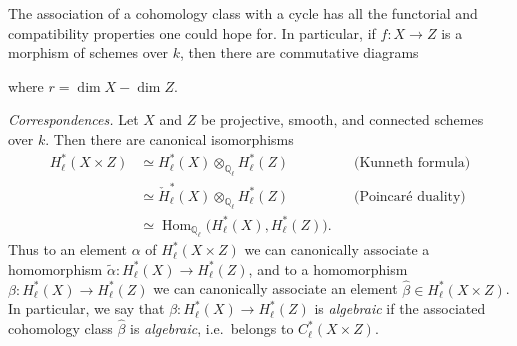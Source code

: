 \documentclass[11pt,a4paper]{article}
\begin{document}

The association of a cohomology class with a cycle has all the functorial and
compatibility properties one could hope for. In particular, if
$f : X \to Z$ is a morphism of schemes over $k$, then there are commutative
diagrams



where $r = \dim X - \dim Z$.

\emph{Correspondences.} Let $X$ and $Z$ be projective, smooth, and connected
schemes over $k$. Then there are canonical isomorphisms
\[
\begin{aligned}
H^{*}_{\ell}(X \times Z) &\simeq H^{*}_{\ell}(X) \otimes_{\mathbb{Q}_{\ell}} H^{*}_{\ell}(Z)
&& \text{(Kunneth formula)} \\
&\simeq \check{H}^{*}_{\ell}(X) \otimes_{\mathbb{Q}_{\ell}} H^{*}_{\ell}(Z)
&& \text{(Poincaré duality)} \\
&\simeq \operatorname{Hom}_{\mathbb{Q}_{\ell}}\bigl(H^{*}_{\ell}(X), H^{*}_{\ell}(Z)\bigr) .
\end{aligned}
\]
Thus to an element $\alpha$ of $H^{*}_{\ell}(X \times Z)$ we can canonically
associate a homomorphism $\tilde{\alpha} : H^{*}_{\ell}(X) \to H^{*}_{\ell}(Z)$,
and to a homomorphism $\beta : H^{*}_{\ell}(X) \to H^{*}_{\ell}(Z)$ we can
canonically associate an element $\hat{\beta} \in H^{*}_{\ell}(X \times Z)$.
In particular, we say that $\beta : H^{*}_{\ell}(X) \to H^{*}_{\ell}(Z)$ is
\emph{algebraic} if the associated cohomology class $\hat{\beta}$ is
\emph{algebraic}, i.e.\ belongs to $C^{*}_{\ell}(X \times Z)$.
\end{document}
